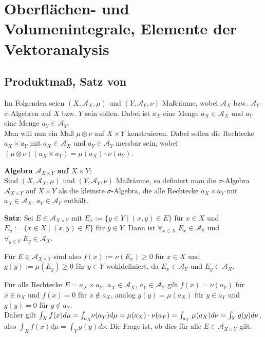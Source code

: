 \chapter{%
    Oberflächen- und Volumenintegrale, Elemente der Vektoranalysis%
}

\section{%
    Produktmaß, Satz von %
}

Im Folgenden seien $(X, \mathcal{A}_X, \mu)$ und $(Y, \mathcal{A}_Y, \nu)$
Maßräume, wobei $\mathcal{A}_X$ bzw. $\mathcal{A}_Y$ $\sigma$-Algebren auf
$X$ bzw. $Y$ sein sollen.
Dabei ist $a_X$ eine Menge $a_X \in \mathcal{A}_X$ und
$a_Y$ eine Menge $a_Y \in \mathcal{A}_Y$. \\
Man will nun ein Maß $\mu \otimes \nu$ auf $X \times Y$ konstruieren.
Dabei sollen die Rechtecke $a_X \times a_Y$ mit $a_X \in \mathcal{A}_X$ und
$a_Y \in \mathcal{A}_Y$ messbar sein, wobei
$(\mu \otimes \nu)(a_X \times a_Y) = \mu(a_X) \cdot \nu(a_Y)$.

\textbf{Algebra $\mathcal{A}_{X \times Y}$ auf $X \times Y$}: \\
Sind $(X, \mathcal{A}_X, \mu)$ und $(Y, \mathcal{A}_Y, \nu)$ Maßräume,
so definiert man die $\sigma$-Algebra $\mathcal{A}_{X \times Y}$ auf
$X \times Y$ als die kleinste $\sigma$-Algebra,
die alle Rechtecke $a_X \times a_Y$ mit
$a_X \in \mathcal{A}_X$, $a_Y \in \mathcal{A}_Y$ enthält.

\linie

\textbf{Satz}:
Sei $E \in \mathcal{A}_{X \times Y}$ mit
$E_x := \{y \in Y \;|\; (x, y) \in E\}$ für $x \in X$ und
$E_y := \{x \in X \;|\; (x, y) \in E\}$ für $y \in Y$.
Dann ist $\forall_{x \in X}\; E_x \in \mathcal{A}_Y$ und
$\forall_{y \in Y}\; E_y \in \mathcal{A}_X$.

Für $E \in \mathcal{A}_{X \times Y}$ sind also
$f(x) := \nu(E_x) \ge 0$ für $x \in X$ und
$g(y) := \mu(E_y) \ge 0$ für $y \in Y$ wohldefiniert,
da $E_x \in \mathcal{A}_Y$ und $E_y \in \mathcal{A}_X$.

\linie

Für alle Rechtecke $E = a_X \times a_Y$, $a_X \in \mathcal{A}_X$,
$a_Y \in \mathcal{A}_Y$ gilt $f(x) = \nu(a_Y)$ für $x \in a_X$ und
$f(x) = 0$ für $x \notin a_X$, analog $g(y) = \mu(a_X)$ für $y \in a_Y$ und
$g(y) = 0$ für $y \notin a_Y$. \\
Daher gilt $\int_X f(x) d\mu = \int_{a_X} \hspace{-1mm}\nu(a_Y) d\mu =
\mu(a_X) \cdot \nu(a_Y) = \int_{a_Y} \mu(a_X) d\nu = \int_Y g(y) d\nu$,
also $\int_X f(x) d\mu = \int_Y g(y) d\nu$.
Die Frage ist, ob dies für alle $E \in \mathcal{A}_{X \times Y}$ gilt.

